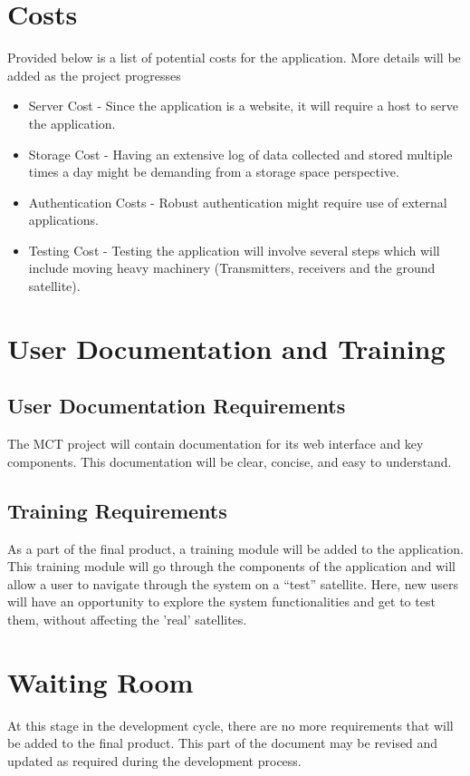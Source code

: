 \documentclass[12pt]{article}
\begin{document}
\section{Costs}
Provided below is a list of potential costs for the application. More details will be added as the project progresses
\begin{itemize}
    \item Server Cost - Since the application is a website, it will require a host to serve the application.
    \item Storage Cost - Having an extensive log of data collected and stored multiple times a day might be demanding from a storage space perspective. 

    \item Authentication Costs - Robust authentication might require use of external applications.
    \item Testing Cost - Testing the application will involve several steps which will include moving heavy machinery (Transmitters, receivers and the ground satellite).

\end{itemize}
\section{User Documentation and Training}
\subsection{User Documentation Requirements}
 The MCT project will contain documentation for its web interface and key components. This documentation will be clear, concise, and easy to understand.

\subsection{Training Requirements}
As a part of the final product, a training module will be added to the application. This training module will go through the components of the application and will allow a user to navigate through the system on a “test” satellite. Here, new users will have an opportunity to explore the system functionalities and get to test them, without affecting the 'real' satellites. 

\section{Waiting Room}
At this stage in the development cycle, there are no more requirements that will be added to the final product. This part of the document may be revised and updated as required during the development process.
\end{document}
